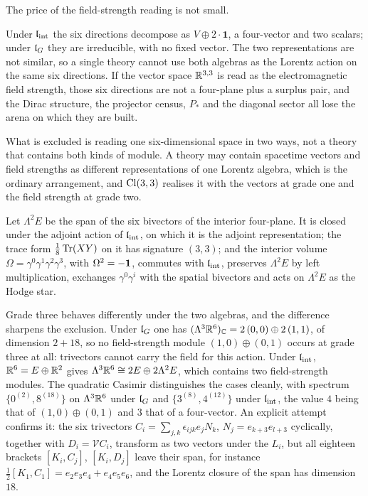 The price of the field-strength reading is not small.

\begin{proposition}[Exclusion]
\label{prop:emexclusive}
Under $\mathfrak l_{\rm int}$ the six directions decompose as $V\oplus2\cdot\mathbf1$, a four-vector and two scalars; under $\mathfrak l_G$ they are
irreducible, with no fixed vector. The two representations are not similar, so a single theory cannot use both algebras as the
Lorentz action on the same six directions. If the vector space $\mathbb{R}^{3,3}$ is read as the electromagnetic field strength, those six
directions are not a four-plane plus a surplus pair, and the Dirac structure, the projector census, $P_*$ and the diagonal sector
all lose the arena on which they are built.
\end{proposition}

What is excluded is reading one six-dimensional space in two ways, not a theory that contains both kinds of module. A theory may
contain spacetime vectors and field strengths as different representations of one Lorentz algebra, which is the ordinary
arrangement, and $\mathrm{Cl}(3,3)$ realises it with the vectors at grade one and the field strength at grade two.

\begin{proposition}
\label{prop:bivectorF}
Let $\Lambda^2E$ be the span of the six bivectors of the interior four-plane. It is closed under the adjoint action of $\mathfrak l_{\rm int}$, on
which it is the adjoint representation; the trace form $\tfrac18\operatorname{Tr}(XY)$ on it has signature $(3,3)$; and the interior volume
$\Omega=\gamma^0\gamma^1\gamma^2\gamma^3$, with $\Omega^2=-\mathbf 1$, commutes with $\mathfrak l_{\rm int}$, preserves $\Lambda^2E$ by left multiplication,
exchanges $\gamma^0\gamma^i$ with the spatial bivectors and acts on $\Lambda^2E$ as the Hodge star.
\end{proposition}

Grade three behaves differently under the two algebras, and the difference sharpens the exclusion. Under $\mathfrak l_G$ one has
$(\Lambda^3\mathbb{R}^6)_{\mathbb{C}}=2\,(0,0)\oplus2\,(1,1)$, of dimension $2+18$, so no field-strength module $(1,0)\oplus(0,1)$ occurs at grade three
at all: trivectors cannot carry the field for this action. Under $\mathfrak l_{\rm int}$, $\mathbb{R}^6=E\oplus\mathbb{R}^2$ gives $\Lambda^3\mathbb{R}^6\cong2E\oplus2\Lambda^2E$,
which contains two field-strength modules. The quadratic Casimir distinguishes the cases cleanly, with spectrum $\{0^{(2)},8^{(18)}\}$
on $\Lambda^3\mathbb{R}^6$ under $\mathfrak l_G$ and $\{3^{(8)},4^{(12)}\}$ under $\mathfrak l_{\rm int}$, the value $4$ being that of $(1,0)\oplus(0,1)$ and $3$ that of a
four-vector. An explicit attempt confirms it: the six trivectors $C_i=\sum_{j,k}\epsilon_{ijk}e_jN_k$, $N_j=e_{k+3}e_{l+3}$ cyclically,
together with $D_i=\mathcal VC_i$, transform as two vectors under the $L_i$, but all eighteen brackets $[K_i,C_j]$, $[K_i,D_j]$ leave
their span, for instance $\tfrac12[K_1,C_1]=e_2e_3e_4+e_4e_5e_6$, and the Lorentz closure of the span has dimension $18$.

